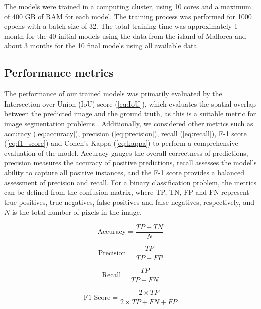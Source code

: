 The models were trained in a computing cluster, using 10 cores and a maximum of
400 GB of RAM for each model. The training process was performed for 1000
epochs with a batch size of 32. The total training time was approximately 1
month for the 40 initial models using the data from the island of Mallorca and
about 3 months for the 10 final models using all available data.

\subsection{Performance metrics}

The performance of our trained models was primarily evaluated by the
Intersection over Union (IoU) score (\cref{eq:IoU}), which evaluates the
spatial overlap between the predicted image and the ground truth, as this is a
suitable metric for image segmentation problems \cite{rahman2016optimizing}.
Additionally, we considered other metrics such as accuracy
(\cref{eq:accuracy}), precision (\cref{eq:precision}), recall
(\cref{eq:recall}), F-1 score (\cref{eq:f1_score}) and Cohen's Kappa
(\cref{eq:kappa}) to perform a comprehensive evaluation of the model. Accuracy
gauges the overall correctness of predictions, precision measures the accuracy
of positive predictions, recall assesses the model's ability to capture all
positive instances, and the F-1 score provides a balanced assessment of
precision and recall. For a binary classification problem, the metrics can be
defined from the confusion matrix, where TP, TN, FP and FN represent true
positives, true negatives, false positives and false negatives, respectively,
and $N$ is the total number of pixels in the image.

\begin{equation}\label{eq:accuracy}
    \text{Accuracy} = \frac{TP + TN}{N}
\end{equation}

\begin{equation}\label{eq:precision}
    \text{Precision} = \frac{TP}{TP + FP}
\end{equation}

\begin{equation}\label{eq:recall}
    \text{Recall} = \frac{TP}{TP + FN}
\end{equation}

\begin{equation}\label{eq:f1_score}
    \text{F1 Score} = \frac{2\times TP}{2\times TP + FN + FP}
\end{equation}


